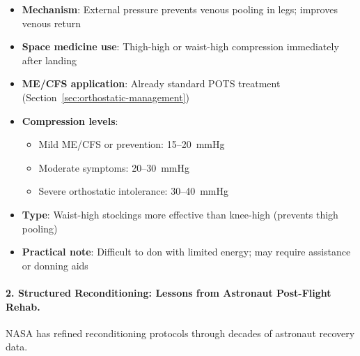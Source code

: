 \begin{itemize}
    \item \textbf{Mechanism}: External pressure prevents venous pooling in legs; improves venous return
    \item \textbf{Space medicine use}: Thigh-high or waist-high compression immediately after landing
    \item \textbf{ME/CFS application}: Already standard POTS treatment (Section~\ref{sec:orthostatic-management})
    \item \textbf{Compression levels}:
    \begin{itemize}
        \item Mild ME/CFS or prevention: 15--20~mmHg
        \item Moderate symptoms: 20--30~mmHg
        \item Severe orthostatic intolerance: 30--40~mmHg
    \end{itemize}
    \item \textbf{Type}: Waist-high stockings more effective than knee-high (prevents thigh pooling)
    \item \textbf{Practical note}: Difficult to don with limited energy; may require assistance or donning aids
\end{itemize}

\paragraph{2. Structured Reconditioning: Lessons from Astronaut Post-Flight Rehab.}
NASA has refined reconditioning protocols through decades of astronaut recovery data.

